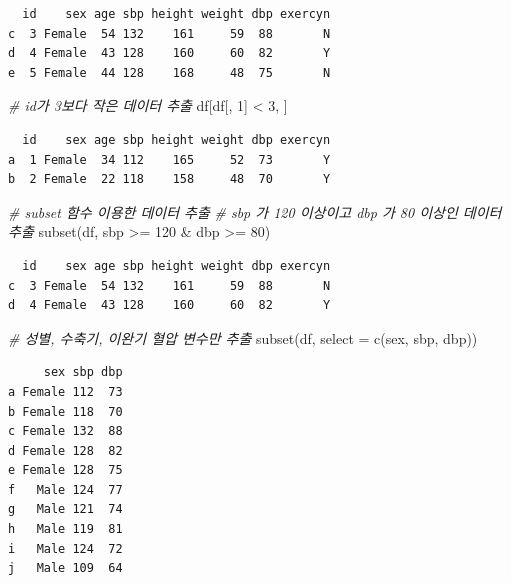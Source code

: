 \documentclass[
  11pt,
]{krantz}
\newenvironment{Shaded}{\begin{snugshade}}{\end{snugshade}}
\newcommand{\AttributeTok}[1]{\textcolor[rgb]{0.61,0.61,0.61}{#1}}
\newcommand{\CommentTok}[1]{\textcolor[rgb]{0.37,0.37,0.37}{\textit{#1}}}
\newcommand{\DecValTok}[1]{\textcolor[rgb]{0.06,0.06,0.06}{#1}}
\newcommand{\FunctionTok}[1]{\textcolor[rgb]{0,0,0}{#1}}
\newcommand{\NormalTok}[1]{#1}
\newcommand{\SpecialCharTok}[1]{\textcolor[rgb]{0,0,0}{#1}}
\begin{document}
\begin{verbatim}
  id    sex age sbp height weight dbp exercyn
c  3 Female  54 132    161     59  88       N
d  4 Female  43 128    160     60  82       Y
e  5 Female  44 128    168     48  75       N
\end{verbatim}

\begin{Shaded}
\begin{Highlighting}[]
\CommentTok{\# id가 3보다 작은 데이터 추출}
\NormalTok{df[df[, }\DecValTok{1}\NormalTok{] }\SpecialCharTok{\textless{}} \DecValTok{3}\NormalTok{, ]}
\end{Highlighting}
\end{Shaded}

\begin{verbatim}
  id    sex age sbp height weight dbp exercyn
a  1 Female  34 112    165     52  73       Y
b  2 Female  22 118    158     48  70       Y
\end{verbatim}

\begin{Shaded}
\begin{Highlighting}[]
\CommentTok{\# subset 함수 이용한 데이터 추출}
\CommentTok{\# sbp 가 120 이상이고 dbp 가 80 이상인 데이터 추출}
\FunctionTok{subset}\NormalTok{(df, sbp }\SpecialCharTok{\textgreater{}=} \DecValTok{120} \SpecialCharTok{\&}\NormalTok{ dbp }\SpecialCharTok{\textgreater{}=} \DecValTok{80}\NormalTok{)}
\end{Highlighting}
\end{Shaded}

\begin{verbatim}
  id    sex age sbp height weight dbp exercyn
c  3 Female  54 132    161     59  88       N
d  4 Female  43 128    160     60  82       Y
\end{verbatim}

\begin{Shaded}
\begin{Highlighting}[]
\CommentTok{\# 성별, 수축기, 이완기 혈압 변수만 추출}
\FunctionTok{subset}\NormalTok{(df, }\AttributeTok{select =} \FunctionTok{c}\NormalTok{(sex, sbp, dbp))}
\end{Highlighting}
\end{Shaded}

\begin{verbatim}
     sex sbp dbp
a Female 112  73
b Female 118  70
c Female 132  88
d Female 128  82
e Female 128  75
f   Male 124  77
g   Male 121  74
h   Male 119  81
i   Male 124  72
j   Male 109  64
\end{verbatim}
\end{document}

